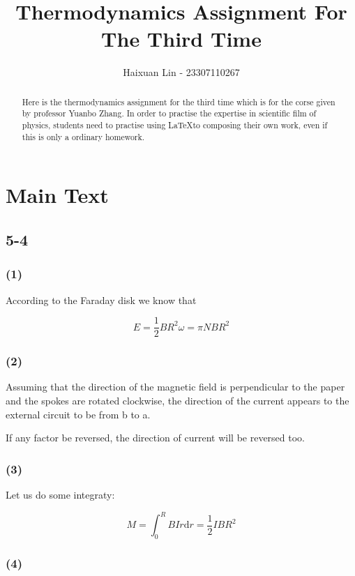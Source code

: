 \documentclass[a4paper,11pt]{amsart}
\title{Thermodynamics Assignment For The Third Time}
\author{Haixuan Lin - 23307110267}
\theoremstyle{definition}
\begin{document}
	
	\begin{abstract}
		Here is the thermodynamics assignment for the third time which is for the corse given by professor Yuanbo Zhang. In order to practise the expertise in scientific film of physics, students need to practise using \LaTeX to composing their own work, even if this is only a ordinary homework.
	\end{abstract}
	
	\maketitle
	
	\section*{Main Text}
	
	\subsection*{5-4}
	
	\subsubsection*{(1)}
	
	According to the Faraday disk we know that
	
	$$
	E=\dfrac{1}{2}BR^2\omega=\pi NBR^2	
	$$
	
	
	\subsubsection*{(2)}
	
	Assuming that the direction of the magnetic field is perpendicular to the paper and the spokes are rotated clockwise, the direction of the current appears to the external circuit to be from b to a.
	
	If any factor be reversed, the direction of current will be reversed too.
		
	\subsubsection*{(3)}
	
	Let us do some integraty:
	
	$$
	M=\int_0^R{BIr\mathrm{d}r=\frac{1}{2}IBR^2}
	$$
	
	\subsubsection*{(4)}
	
\end{document}
